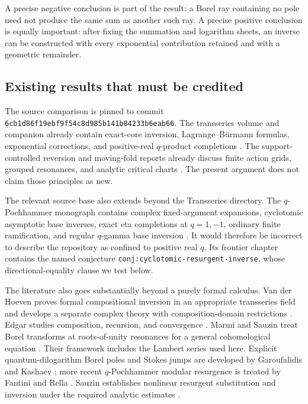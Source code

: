 A precise negative conclusion is part of the result:
a Borel ray containing no pole need not produce the same sum as another
such ray.  A precise positive conclusion is equally important:
after fixing the summation and logarithm sheets, an inverse can be
constructed with every exponential contribution retained and with a
geometric remainder.

\subsection{Existing results that must be credited}

The source comparison is pinned to commit
\texttt{6cb1d86f19ebf9f54c8d985b141b84233b6eab66}.
The \repo{} transseries volume and companion already contain exact-core
inversion, Lagrange--B\"urmann formulas, exponential corrections, and
positive-real \(q\)-product completions \cite{repo-trans,repo-companion}.
The support-controlled reversion and moving-fold reports already discuss
finite action grids, grouped resonances, and analytic critical charts
\cite{repo-reversion,repo-fold}.  The present argument does not claim
those principles as new.

The relevant source base also extends beyond the Transseries directory.
The \(q\)-Pochhammer monograph contains complex fixed-argument expansions,
cyclotomic asymptotic base inverses, exact eta completions at \(q=1,-1\),
ordinary finite ramification, and regular \(q\)-gamma base inversion
\cite{repo-qmono}.  It would therefore be incorrect to describe the
repository as confined to positive real \(q\).  Its frontier chapter
contains the named conjecture
\texttt{conj:cyclotomic-resurgent-inverse}, whose directional-equality
clause we test below.

The literature also goes substantially beyond a purely formal calculus.
Van der Hoeven proves formal compositional inversion in an appropriate
transseries field and develops a separate complex theory with
composition-domain restrictions \cite{vdh-book,vdh-complex}.
Edgar studies composition, recursion, and convergence
\cite{edgar}.  Marmi and Sauzin treat Borel transforms at roots-of-unity
resonances for a general cohomological equation
\cite[Sections 4.2--4.3]{marmi-sauzin}.  Their framework includes the
Lambert series used here.  Explicit quantum-dilogarithm Borel poles and
Stokes jumps are developed by Garoufalidis and Kashaev
\cite{garoufalidis-kashaev}; more recent \(q\)-Pochhammer modular
resurgence is treated by Fantini and Rella \cite{fantini-rella}.
Sauzin establishes nonlinear resurgent substitution and inversion under
the required analytic estimates \cite{sauzin}.


